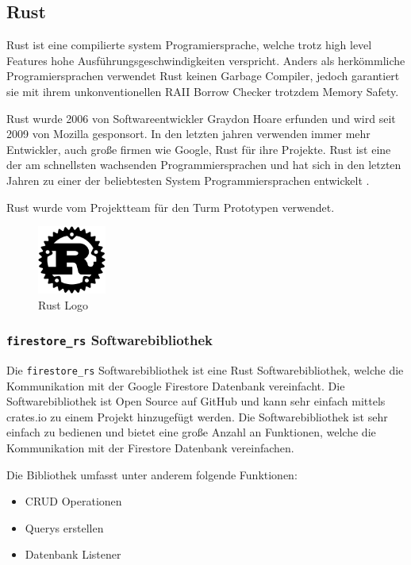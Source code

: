 \subsection{Rust}

Rust ist eine compilierte system Programiersprache, welche trotz high level Features hohe Ausführungsgeschwindigkeiten verspricht. Anders als herkömmliche Programiersprachen verwendet Rust keinen Garbage Compiler, jedoch garantiert sie mit ihrem unkonventionellen \ac{RAII} Borrow Checker trotzdem Memory Safety.


Rust wurde 2006 von Softwareentwickler Graydon Hoare erfunden und wird seit 2009 von Mozilla gesponsort\cite{rust_ursprung}. In den letzten jahren verwenden immer mehr Entwickler, auch große firmen wie Google, Rust für ihre Projekte. Rust ist eine der am schnellsten wachsenden Programmiersprachen und hat sich in den letzten Jahren zu einer der beliebtesten System Programmiersprachen entwickelt \cite{stackoverflow_survey}.

Rust wurde vom Projektteam für den Turm Prototypen verwendet.

\begin{figure}[ht]
  \centering
  \includegraphics[width=0.20\textwidth]{images/rust_logo.png}
  \caption{Rust Logo}
  \label{fig:rust_logo}
\end{figure}

\subsubsection{\texttt{firestore\_rs} Softwarebibliothek}

Die \texttt{firestore\_rs} Softwarebibliothek ist eine Rust Softwarebibliothek, welche die Kommunikation mit der Google Firestore Datenbank vereinfacht. Die Softwarebibliothek ist Open Source auf GitHub und kann sehr einfach mittels crates.io zu einem Projekt hinzugefügt werden. Die Softwarebibliothek ist sehr einfach zu bedienen und bietet eine große Anzahl an Funktionen, welche die Kommunikation mit der Firestore Datenbank vereinfachen.

Die Bibliothek umfasst unter anderem folgende Funktionen:
\begin{itemize}
  \item \ac{CRUD} Operationen
  \item Querys erstellen
  \item Datenbank Listener
\end{itemize}

